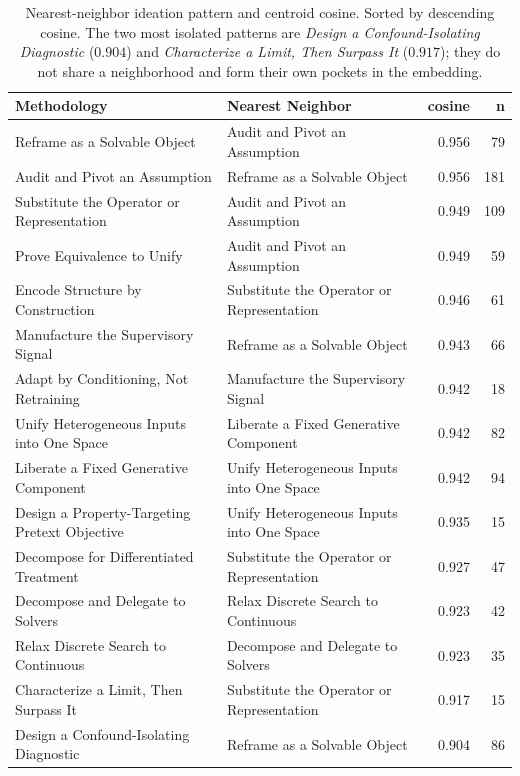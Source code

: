 \documentclass[10pt,a4paper]{article}
\begin{document}
\begin{table}[!htbp]
\centering
\caption{Nearest-neighbor ideation pattern and centroid cosine. Sorted by descending cosine. The two most isolated patterns are \emph{Design a Confound-Isolating Diagnostic} ($0.904$) and \emph{Characterize a Limit, Then Surpass It} ($0.917$); they do not share a neighborhood and form their own pockets in the embedding.}
\label{tab:nn}
\small
\begin{tabular}{p{6.0cm} p{6.0cm} r r}
\toprule
\textbf{Methodology} & \textbf{Nearest Neighbor} & \textbf{cosine} & \textbf{n} \\
\midrule
Reframe as a Solvable Object & Audit and Pivot an Assumption & 0.956 & 79 \\
Audit and Pivot an Assumption & Reframe as a Solvable Object & 0.956 & 181 \\
Substitute the Operator or Representation & Audit and Pivot an Assumption & 0.949 & 109 \\
Prove Equivalence to Unify & Audit and Pivot an Assumption & 0.949 & 59 \\
Encode Structure by Construction & Substitute the Operator or Representation & 0.946 & 61 \\
Manufacture the Supervisory Signal & Reframe as a Solvable Object & 0.943 & 66 \\
Adapt by Conditioning, Not Retraining & Manufacture the Supervisory Signal & 0.942 & 18 \\
Unify Heterogeneous Inputs into One Space & Liberate a Fixed Generative Component & 0.942 & 82 \\
Liberate a Fixed Generative Component & Unify Heterogeneous Inputs into One Space & 0.942 & 94 \\
Design a Property-Targeting Pretext Objective & Unify Heterogeneous Inputs into One Space & 0.935 & 15 \\
Decompose for Differentiated Treatment & Substitute the Operator or Representation & 0.927 & 47 \\
Decompose and Delegate to Solvers & Relax Discrete Search to Continuous & 0.923 & 42 \\
Relax Discrete Search to Continuous & Decompose and Delegate to Solvers & 0.923 & 35 \\
Characterize a Limit, Then Surpass It & Substitute the Operator or Representation & 0.917 & 15 \\
Design a Confound-Isolating Diagnostic & Reframe as a Solvable Object & 0.904 & 86 \\
\bottomrule
\end{tabular}
\end{table}
\end{document}
